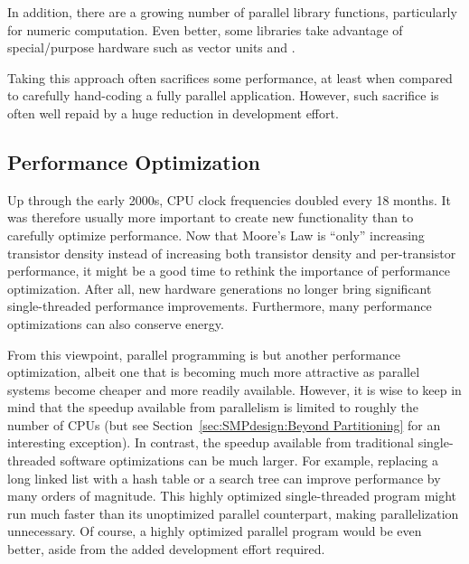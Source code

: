In addition, there are a growing number of parallel library functions,
particularly for numeric computation.
Even better, some libraries take advantage of special\-/purpose
hardware such as vector units and .

Taking this approach often sacrifices some performance, at least when
compared to carefully hand-coding a fully parallel application.
However, such sacrifice is often well repaid by a huge reduction in
development effort.

\QuickQuizEnd

\subsection{Performance Optimization}
\label{sec:intro:Performance Optimization}

Up through the early 2000s, CPU clock frequencies doubled every 18 months.
It was therefore usually more important to create new functionality than to
carefully optimize performance.
Now that Moore's Law is ``only'' increasing transistor density instead
of increasing both transistor density and per-transistor performance,
it might be a good time to rethink the importance of performance
optimization.
After all, new hardware generations no longer bring significant
single-threaded performance improvements.
Furthermore, many performance optimizations can also conserve energy.

From this viewpoint, parallel programming is but another performance
optimization, albeit one that is becoming much more attractive
as parallel systems become cheaper and more readily available.
However, it is wise to keep in mind that the speedup available from
parallelism is limited to roughly the number of CPUs
(but see Section~\ref{sec:SMPdesign:Beyond Partitioning}
for an interesting exception).
In contrast, the speedup available from traditional single-threaded
software optimizations can be much larger.
For example, replacing a long linked list with a hash table
or a search tree can improve performance by many orders of magnitude.
This highly optimized single-threaded program might run much
faster than its unoptimized parallel counterpart, making parallelization
unnecessary.
Of course, a highly optimized parallel program would be even better,
aside from the added development effort required.

